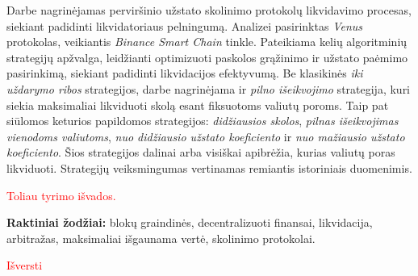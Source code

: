 \documentclass[]{VUMIFTemplateClass}
\begin{document}

\singlespacing


\tableofcontents

\onehalfspacing

Darbe nagrinėjamas perviršinio užstato skolinimo protokolų likvidavimo procesas, siekiant padidinti likvidatoriaus pelningumą. Analizei pasirinktas \textit{Venus} protokolas, veikiantis \textit{Binance Smart Chain} tinkle. Pateikiama kelių algoritminių strategijų apžvalga, leidžianti optimizuoti paskolos grąžinimo ir užstato paėmimo pasirinkimą, siekiant padidinti likvidacijos efektyvumą. Be klasikinės \textit{iki uždarymo ribos} strategijos, darbe nagrinėjama ir \textit{pilno išeikvojimo} strategija, kuri siekia maksimaliai likviduoti skolą esant fiksuotoms valiutų poroms. Taip pat siūlomos keturios papildomos strategijos: \textit{didžiausios skolos}, \textit{pilnas išeikvojimas vienodoms valiutoms}, \textit{nuo didžiausio užstato koeficiento} ir \textit{nuo mažiausio užstato koeficiento}. Šios strategijos dalinai arba visiškai apibrėžia, kurias valiutų poras likviduoti. Strategijų veiksmingumas vertinamas remiantis istoriniais duomenimis.

\textcolor{red}{Toliau tyrimo išvados.}

\noindent\textbf{Raktiniai žodžiai:} blokų graindinės, decentralizuoti finansai, likvidacija, arbitražas, maksimaliai išgaunama vertė, skolinimo protokolai.

\textcolor{red}{Išversti}
\end{document}
